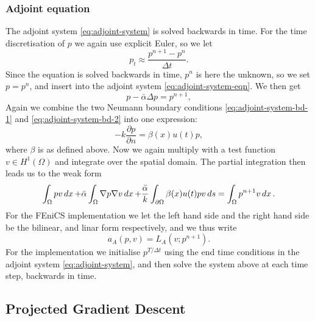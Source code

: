 \subsubsection{Adjoint equation}

The adjoint system \eqref{eq:adjoint-system} is solved backwards in time. For the time discretisation of $p$ we again use explicit Euler, so we let 
\begin{equation*}
 p_t \approx \frac{p^{n+1} - p^n}{\Delta t}.
\end{equation*}
Since the equation is solved backwards in time, $p^n$ is here the unknown, so we set $p=p^n$, and insert into the adjoint system \eqref{eq:adjoint-system-eqn}. We then get
\begin{equation*}
    p - \bar{\alpha}\Delta p =  p^{n+1}, 
\end{equation*}
Again we combine the two Neumann boundary conditions \eqref{eq:adjoint-system-bd-1} and \eqref{eq:adjoint-system-bd-2} into one expression:
\begin{equation*}
    -k\frac{\partial p}{\partial n} = \beta(x)u(t)p,
\end{equation*}
where $\beta$ is as defined above. Now we again multiply with a test function $v\in H^1(\Omega)$ and integrate over the spatial domain. The partial integration then leads us to the weak form
\begin{equation*}
    \int_\Omega pv\mathop{dx} + \bar{\alpha} \int_\Omega \nabla p \nabla v \mathop{dx} + \frac{\bar{\alpha}}{k}\int_{\partial\Omega} \beta(x)u(t)pv \mathop{ds}  = \int_\Omega p^{n+1}v\mathop{dx}.
\end{equation*}
For the FEniCS implementation we let the left hand side and the right hand side be the bilinear, and linar form respectively, and we thus write
\begin{equation*}
    a_A(p, v) = L_A(v; p^{n+1}).
\end{equation*}
For the implementation we initialise $p^{T/\Delta t}$ using the end time conditions in the adjoint system \eqref{eq:adjoint-system}, and then solve the system above at each time step, backwards in time.


\subsection{Projected Gradient Descent}

